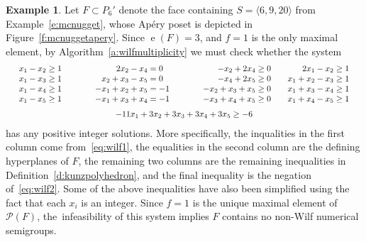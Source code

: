 \documentclass[12pt]{amsart}
\theoremstyle{definition}
\newtheorem{example}[thm]{Example}
\numberwithin{equation}{section}
\renewcommand\>{\rangle}
\newcommand\<{\langle}
\newcommand\0{\mathbf{0}}
\begin{document}
\begin{example}\label{e:wilfmultiplicity}
Let $F \subset P_6'$ denote the face containing $S = \<6, 9, 20\>$ from Example~\ref{e:mcnugget}, whose Ap\'ery poset is depicted in Figure~\ref{f:mcnuggetapery}.  Since $\operatorname e(F) = 3$, and $f = 1$ is the only maximal element, by Algorithm~\ref{a:wilfmultiplicity} we must check whether the system
\[
\begin{array}{c}
\begin{array}{c@{\qquad\quad}c@{\qquad\quad}c@{\quad}c}
\begin{array}{r@{}c@{}l}
x_1 - x_2 &{}\ge{}& 1 \\
x_1 - x_3 &{}\ge{}& 1 \\
x_1 - x_4 &{}\ge{}& 1 \\
x_1 - x_5 &{}\ge{}& 1 \\
\end{array}
&
\begin{array}{r@{}c@{}l}
2x_2 - x_4 &{}={}& 0 \\
x_2 + x_3 - x_5 &{}={}& 0 \\
-x_1 + x_2 + x_5 &{}={}& -1 \\
-x_1 + x_3 + x_4 &{}={}& -1 \\
\end{array}
&
\begin{array}{r@{}c@{}l}
-x_2 + 2x_4 &{}\ge{}& 0 \\
-x_4 + 2x_5 &{}\ge{}& 0 \\
-x_2 + x_3 + x_5 &{}\ge{}& 0 \\
-x_3 + x_4 + x_5 &{}\ge{}& 0 \\
\end{array}
&
\begin{array}{r@{}c@{}l}
2x_1 - x_2 &{}\ge{}& 1 \\
x_1 + x_2 - x_3 &{}\ge{}& 1 \\
x_1 + x_3 - x_4 &{}\ge{}& 1 \\
x_1 + x_4 - x_5 &{}\ge{}& 1 \\
\end{array}
\end{array}
\\\\[-0.6em]
-11x_1 + 3x_2 + 3x_3 + 3x_4 + 3x_5 \ge -6
\end{array}
\]
has any positive integer solutions.  More specifically, the inqualities in the first column come from~\eqref{eq:wilf1}, the equalities in the second column are the defining hyperplanes of $F$, the remaining two columns are the remaining inequalities in Definition~\ref{d:kunzpolyhedron}, and the final inequality is the negation of~\eqref{eq:wilf2}.  Some of the above inequalities have also been simplified using the fact that each $x_i$ is an integer.  Since $f = 1$ is the unique maximal element of $\mathcal P(F)$, the~infeasibility of this system implies $F$ contains no non-Wilf numerical semigroups.
\end{example}
\end{document}
